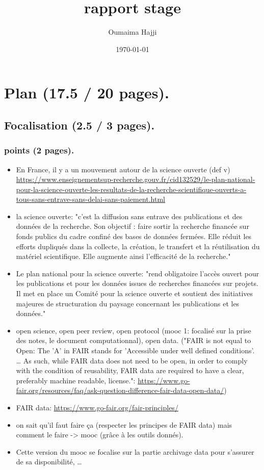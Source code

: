 \documentclass[11pt]{article}
\author{Oumaima Hajji}
\date{\today}
\title{rapport stage}
\begin{document}
\maketitle
\tableofcontents




\section{Plan (17.5 / 20 pages).}
\label{sec:orgdaf812f}
\subsection{Focalisation (2.5 / 3 pages).}
\label{sec:orgd803559}
\subsubsection{points (2 pages).}
\label{sec:org14f3fc4}
\begin{itemize}
\item En France, il y a un mouvement autour de la science ouverte (def v)
\url{https://www.enseignementsup-recherche.gouv.fr/cid132529/le-plan-national-pour-la-science-ouverte-les-resultats-de-la-recherche-scientifique-ouverts-a-tous-sans-entrave-sans-delai-sans-paiement.html}
\item la science ouverte: "c’est la diffusion sans entrave des
publications et des données de la recherche.
Son objectif : faire sortir la recherche financée sur fonds
publics du cadre confiné des bases de données fermées. Elle réduit
les efforts dupliqués dans la collecte, la création, le transfert
et la réutilisation du matériel scientifique. Elle augmente ainsi
l’efficacité de la recherche."
\item Le plan national pour la science ouverte: "rend obligatoire
l’accès ouvert pour les publications et pour les données issues de
recherches financées sur projets. Il met en place un Comité pour
la science ouverte et soutient des initiatives majeures de
structuration du paysage concernant les publications et les
données."
\item open science, open peer review, open protocol (mooc 1: focalisé
sur la prise des notes, le document computationnal), open data.
("FAIR is not equal to Open: The 'A' in FAIR stands for 'Accessible
under well defined conditions'. \ldots{} As such, while FAIR data does
not need to be open, in order to comply with the condition of
reusability, FAIR data are required to have a clear, preferably
machine readable, license.":
\url{https://www.go-fair.org/resources/faq/ask-question-difference-fair-data-open-data/})
\item FAIR data: \url{https://www.go-fair.org/fair-principles/}
\item on sait qu'il faut faire ça (respecter les principes de FAIR data)
mais comment le faire -> mooc (grâce à les outils donnés).
\item Cette version du mooc se focalise sur la partie archivage data
pour s'assurer de sa disponibilité, \ldots{}
\end{itemize}
\end{document}
